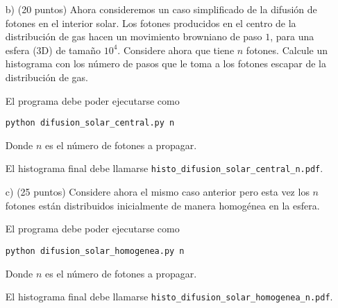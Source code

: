 \documentclass{article}
\begin{document}
\begin{enumerate}
\begin{itemize}
\item[b)] (20 puntos) Ahora consideremos un caso simplificado de la difusi\'on de fotones en el interior solar. Los fotones producidos
  en el centro de la distribuci\'on de gas hacen un movimiento
  browniano de paso $1$, para una esfera (3D) de tama\~no $10^4$. Considere
  ahora que tiene $n$ fotones. Calcule un histograma con los n\'umero
  de pasos que le toma a los fotones escapar de la distribuci\'on de gas.

  El programa debe poder ejecutarse como
\begin{verbatim}
python difusion_solar_central.py n
\end{verbatim}
Donde $n$ es el n\'umero de fotones a propagar. 


El histograma final
debe llamarse \verb"histo_difusion_solar_central_n.pdf".

\item[c)] (25 puntos) Considere ahora el mismo caso anterior pero esta vez los $n$ fotones est\'an distribuidos inicialmente de manera homog\'enea en
  la esfera.

El programa debe poder ejecutarse como

\begin{verbatim}
python difusion_solar_homogenea.py n
\end{verbatim}

Donde $n$ es el n\'umero de fotones a propagar. 

El histograma final
debe llamarse \verb"histo_difusion_solar_homogenea_n.pdf".

\end{itemize}

\end{enumerate}
\end{document}
